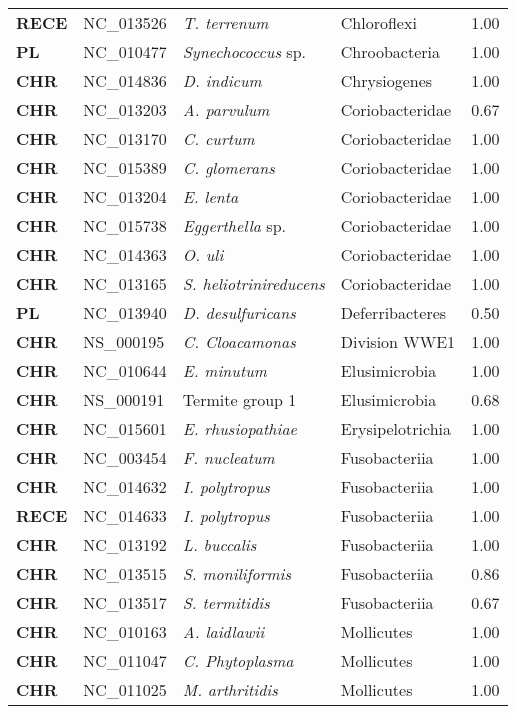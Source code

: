 \begin{adjustwidth}{-3cm}{2cm}
{\begin{supertabular}{>{\bfseries}l|p{0.1\textwidth}p{0.14\textwidth}l|l}
RECE & NC\_013526 & \textit{T. terrenum} & Chloroflexi & 1.00\\
PL & NC\_010477 & \textit{Synechococcus} sp. & Chroobacteria & 1.00\\
CHR & NC\_014836 & \textit{D. indicum} & Chrysiogenes & 1.00\\
CHR & NC\_013203 & \textit{A. parvulum} & Coriobacteridae & 0.67\\
CHR & NC\_013170 & \textit{C. curtum} & Coriobacteridae & 1.00\\
CHR & NC\_015389 & \textit{C. glomerans} & Coriobacteridae & 1.00\\
CHR & NC\_013204 & \textit{E. lenta} & Coriobacteridae & 1.00\\
CHR & NC\_015738 & \textit{Eggerthella} sp. & Coriobacteridae & 1.00\\
CHR & NC\_014363 & \textit{O. uli} & Coriobacteridae & 1.00\\
CHR & NC\_013165 & \textit{S. heliotrinireducens} & Coriobacteridae & 1.00\\
PL & NC\_013940 & \textit{D. desulfuricans} & Deferribacteres & 0.50\\
CHR & NS\_000195 & \textit{C. Cloacamonas} & Division WWE1 & 1.00\\
CHR & NC\_010644 & \textit{E. minutum} & Elusimicrobia & 1.00\\
CHR & NS\_000191 &  Termite  group 1  & Elusimicrobia & 0.68\\
CHR & NC\_015601 & \textit{E. rhusiopathiae} & Erysipelotrichia & 1.00\\
CHR & NC\_003454 & \textit{F. nucleatum} & Fusobacteriia & 1.00\\
CHR & NC\_014632 & \textit{I. polytropus} & Fusobacteriia & 1.00\\
RECE & NC\_014633 & \textit{I. polytropus} & Fusobacteriia & 1.00\\
CHR & NC\_013192 & \textit{L. buccalis} & Fusobacteriia & 1.00\\
CHR & NC\_013515 & \textit{S. moniliformis} & Fusobacteriia & 0.86\\
CHR & NC\_013517 & \textit{S. termitidis} & Fusobacteriia & 0.67\\
CHR & NC\_010163 & \textit{A. laidlawii} & Mollicutes & 1.00\\
CHR & NC\_011047 & \textit{C. Phytoplasma} & Mollicutes & 1.00\\
CHR & NC\_011025 & \textit{M. arthritidis} & Mollicutes & 1.00\\

\end{supertabular}}
\end{adjustwidth}
